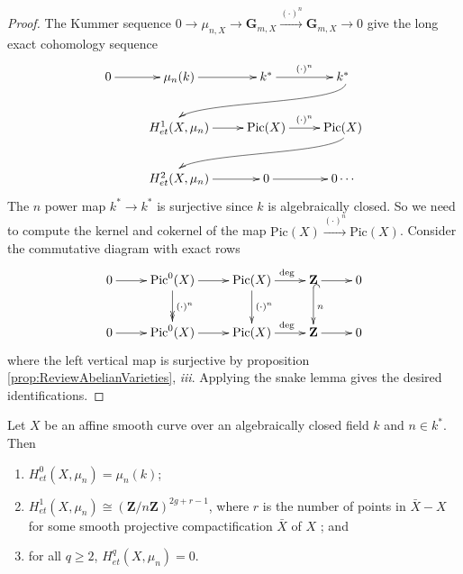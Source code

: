 \begin{proof} 
The Kummer sequence $0\to \mu_{n, X} \to \mathbf{G}_{m, X} \xrightarrow{(\cdot)^n} \mathbf{G}_{m, X}\to 0$ give the long exact cohomology sequence
$$
\xymatrix{
0  \ar[r] & \mu_n(k) \ar[r] & k^* \ar^{(\cdot)^n}[r] & k^* \ar@(rd,ul)[rdllllr]
\\ 
& H_{et}^1(X, \mu_n) \ar[r] & \text{Pic}(X) \ar^{(\cdot)^n}[r] & \text{Pic} (X) \ar@(rd,ul)[rdllllr] \\
& H_{et}^2(X, \mu_n) \ar[r] & 0 \ar[r] & 0 \cdots
}
$$
The $n$ power map $k^* \to k^*$ is surjective since $k$ is algebraically closed. So we need to compute the kernel and cokernel of the map $\text{Pic}(X) \xrightarrow{(\cdot)^n} \text{Pic}(X)$. Consider the commutative diagram with exact rows
$$
\xymatrix{
0 \ar[r] & {\text{Pic}^0(X)} \ar[r] \ar^{(\cdot)^n}@{>>}[d] & {\text{Pic}(X)} \ar^{\ \ \deg}[r] \ar^{(\cdot)^n}[d] & {\mathbf{Z}} \ar[r] \ar^{n}@{^{(}->}[d] & 0\\
0 \ar[r] & {\text{Pic}^0(X)} \ar[r] & {\text{Pic}(X)} \ar^{\ \ \deg}[r] & {\mathbf{Z}} \ar[r] & 0 
}
$$
where the left vertical map is surjective by proposition \ref{prop:ReviewAbelianVarieties}, {\it iii}. Applying the snake lemma gives the desired identifications.
\end{proof}

\begin{lemma} \label{cor:VanishingOfMuForASmoothCurve}
Let $X$ be an affine smooth curve over an algebraically closed field $k$ and $n\in k^*$. Then
\begin{enumerate}
\item 
$H_{et}^0(X, \mu_n) = \mu_n(k)$;
\item
$H_{et}^1(X, \mu_n) \cong \left(\mathbf{Z}/n\mathbf{Z}\right)^{2g+r-1}$, where $r$ is the number of points in $\bar X - X$ for some smooth projective compactification $\bar X$ of $X$ ; and
\item
for all $q\geq 2$, $H_{et}^q(X, \mu_n) = 0$.
\end{enumerate}
\end{lemma}

